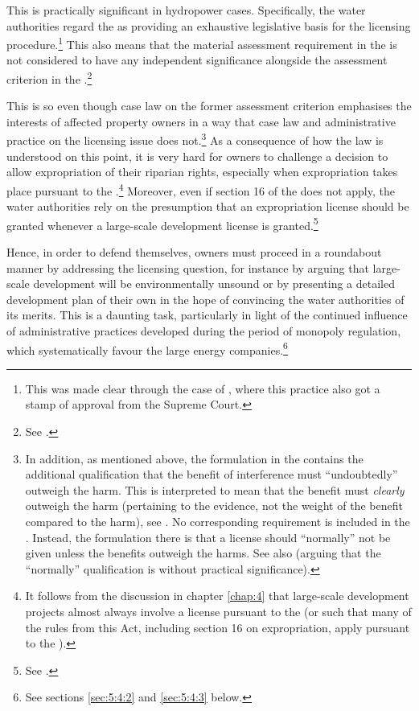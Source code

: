 This is practically significant in hydropower cases. Specifically, the water authorities regard the \cite{wra17} as providing an exhaustive legislative basis for the licensing procedure.\footnote{This was made clear through the case of \cite{jorpeland11}, where this practice also got a stamp of approval from the Supreme Court.} This also means that the material assessment requirement in the \cite{ea59} is not considered to have any independent significance alongside the assessment criterion in the \cite{wra17}.\footnote{See \cite[30]{jorpeland11}.}

This is so even though case law on the former assessment criterion emphasises the interests of affected property owners in a way that case law and administrative practice on the licensing issue does not.\footnote{In addition, as mentioned above, the formulation in the \dni\cite[2]{ea59} contains the additional qualification that the benefit of interference must ``undoubtedly'' outweigh the harm. This is interpreted to mean that the benefit must {\it clearly} outweigh the harm (pertaining to the evidence, not the weight of the benefit compared to the harm), see \cite{lovenskiold09}. No corresponding requirement is included in the \dni\cite[8]{wra17}. Instead, the formulation there is that a license should ``normally'' not be given unless the benefits outweigh the harms. See also \cite[325-236]{haagensen02} (arguing that the ``normally'' qualification is without practical significance).} As a consequence of how the law is understood on this point, it is very hard for owners to challenge a decision to allow expropriation of their riparian rights, especially when expropriation takes place pursuant to the \cite{wra17}.\footnote{It follows from the discussion in chapter \ref{chap:4} that large-scale development projects almost always involve a license pursuant to the \cite{wra17} (or such that many of the rules from this Act, including section 16 on expropriation, apply pursuant to the \cite{wra00}).} Moreover, even if section 16 of the \cite{wra17} does not apply, the water authorities rely on the presumption that an expropriation license should be granted whenever a large-scale development license is granted.\footnote{See \cite{flatby08}.}

Hence, in order to defend themselves, owners must proceed in a roundabout manner by addressing the licensing question, for instance by arguing that large-scale development will be environmentally unsound or by presenting a detailed development plan of their own in the hope of convincing the water authorities of its merits. This is a daunting task, particularly in light of the continued influence of administrative practices developed during the period of monopoly regulation, which systematically favour the large energy companies.\footnote{See sections \ref{sec:5:4:2} and \ref{sec:5:4:3} below.}

